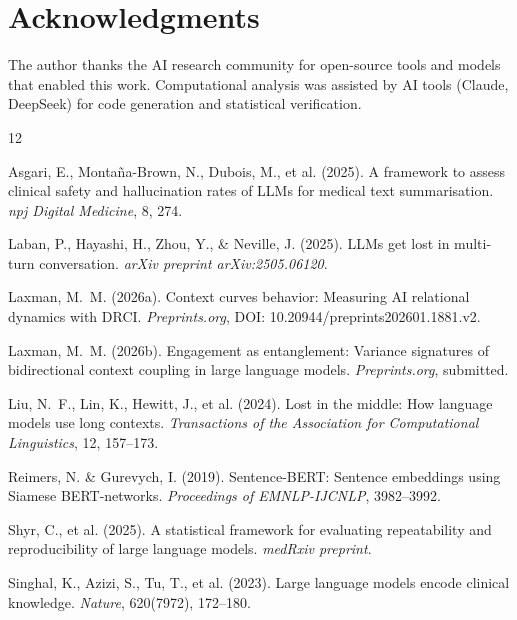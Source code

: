 \documentclass[11pt]{article}
\begin{document}
\section*{Acknowledgments}

The author thanks the AI research community for open-source tools and models that enabled this work. Computational analysis was assisted by AI tools (Claude, DeepSeek) for code generation and statistical verification.


\begin{thebibliography}{12}

Asgari, E., Monta{\~n}a-Brown, N., Dubois, M., et al. (2025).
\newblock A framework to assess clinical safety and hallucination rates of LLMs for medical text summarisation.
\newblock \textit{npj Digital Medicine}, 8, 274.

Laban, P., Hayashi, H., Zhou, Y., \& Neville, J. (2025).
\newblock LLMs get lost in multi-turn conversation.
\newblock \textit{arXiv preprint arXiv:2505.06120}.

Laxman, M.~M. (2026a).
\newblock Context curves behavior: Measuring AI relational dynamics with DRCI.
\newblock \textit{Preprints.org}, DOI: 10.20944/preprints202601.1881.v2.

Laxman, M.~M. (2026b).
\newblock Engagement as entanglement: Variance signatures of bidirectional context coupling in large language models.
\newblock \textit{Preprints.org}, submitted.

Liu, N.~F., Lin, K., Hewitt, J., et al. (2024).
\newblock Lost in the middle: How language models use long contexts.
\newblock \textit{Transactions of the Association for Computational Linguistics}, 12, 157--173.

Reimers, N. \& Gurevych, I. (2019).
\newblock Sentence-BERT: Sentence embeddings using Siamese BERT-networks.
\newblock \textit{Proceedings of EMNLP-IJCNLP}, 3982--3992.

Shyr, C., et al. (2025).
\newblock A statistical framework for evaluating repeatability and reproducibility of large language models.
\newblock \textit{medRxiv preprint}.

Singhal, K., Azizi, S., Tu, T., et al. (2023).
\newblock Large language models encode clinical knowledge.
\newblock \textit{Nature}, 620(7972), 172--180.


\end{thebibliography}
\end{document}
